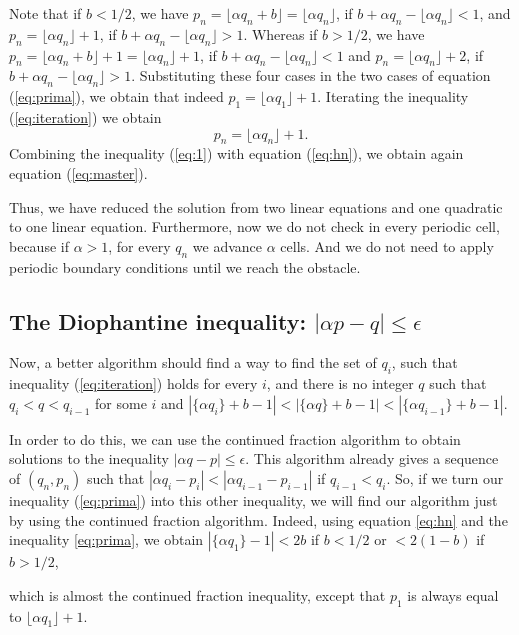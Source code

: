 \documentclass{iopart}
\newcommand{\eqref}[1]{(\ref{#1})}
\begin{document}
Note that if $b < 1/2$, we have
$p_n= \lfloor \alpha q_n +b  \rfloor= \lfloor \alpha q_n  \rfloor $, if $b+\alpha q_n-\lfloor \alpha q_n  \rfloor < 1$, and  
$p_{n} = \lfloor \alpha q_n  \rfloor+1$, if  $b+\alpha q_n-\lfloor \alpha q_n  \rfloor > 1$.
Whereas if $b>1/2$, we  have $p_n= \lfloor \alpha q_n +b  \rfloor+1= \lfloor \alpha q_n  \rfloor+1$, if $b+\alpha q_n-\lfloor \alpha q_n  \rfloor < 1$ and 
$ p_{n} = \lfloor \alpha q_n  \rfloor+2$, if $b+\alpha q_n-\lfloor \alpha q_n  \rfloor > 1$. Substituting these four cases  in the two cases of equation \eqref{eq:prima}, we obtain that indeed $p_1= \lfloor \alpha q_1  \rfloor+1$. Iterating the inequality \eqref{eq:iteration} we obtain 
\begin{equation}
 p_n= \lfloor \alpha q_n  \rfloor+1.
\label{eq:hn}
\end{equation}
Combining the inequality \eqref{eq:1} with equation \eqref{eq:hn}, we obtain again equation \eqref{eq:master}. 

Thus, we have reduced the solution from two linear equations and one quadratic to one linear equation. Furthermore, now we do not check in every periodic cell, because if $\alpha >1$, for every $q_n$ we advance $\alpha$ cells. And we do not need to apply periodic boundary conditions until we reach the obstacle. 

\subsection{The Diophantine inequality: $|\alpha p - q|\leq \epsilon$}

Now, a better algorithm should find a way to find the set of $q_i$, such that inequality \eqref{eq:iteration} holds for every $i$, and there is no integer $q$  such that $q_i<q<q_{i-1}$ for some $i$ and
$|\{ \alpha  q_i \}+b -1|<|\{ \alpha  q \}+b -1| <|\{ \alpha  q_{i-1} \}+b -1|$. 

In order to do this, we can use the continued fraction algorithm to obtain solutions to the inequality $|\alpha q - p|\leq \epsilon$. This algorithm already gives a sequence of $(q_n,p_n)$ such that $|\alpha q_i - p_i|<|\alpha q_{i-1} - p_{i-1}|$ if $q_{i-1} <q_i$. So, if we turn our inequality \eqref{eq:prima} into this other inequality, we will find our algorithm just by using the continued fraction algorithm.
Indeed, using equation \ref{eq:hn} and the inequality \ref{eq:prima}, we obtain $|\{ \alpha  q_1 \} -1|< 2b$ if $b < 1/2$ or $<  2(1-b)$  if $b > 1/2$, 

which is almost the continued fraction inequality, except that $p_1$ is always equal to $\lfloor \alpha q_1  \rfloor+1$. 
\end{document}
